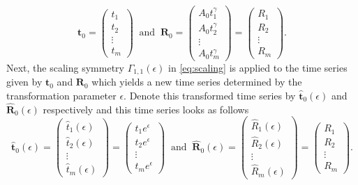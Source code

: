 $$\mathbf{t}_0=\begin{pmatrix}t_1\\t_2\\\vdots\\t_m\end{pmatrix}\;\;\mathrm{and}\;\;\mathbf{R}_0=\begin{pmatrix}A_0t_1^{\gamma} \\A_0t_2^{\gamma}\\\vdots\\A_0t_m^{\gamma}\end{pmatrix}=\begin{pmatrix}R_1 \\R_2\\\vdots\\R_m\end{pmatrix}.$$
Next, the scaling symmetry $\Gamma_{1,1}(\epsilon)$ in \eqref{eq:scaling} is applied to the time series given by $\mathbf{t}_0$ and $\mathbf{R}_0$ which yields a new time series determined by the transformation parameter $\epsilon$. Denote this transformed time series by $\mathbf{\hat{t}}_0(\epsilon)$ and $\mathbf{\hat{R}}_0(\epsilon)$ respectively and this time series looks as follows
$$\mathbf{\hat{t}}_0(\epsilon)=\begin{pmatrix}\hat{t}_1(\epsilon)\\\hat{t}_2(\epsilon)\\\vdots\\\hat{t}_m(\epsilon)\end{pmatrix}=\begin{pmatrix}t_1e^{\epsilon}\\t_2e^{\epsilon}\\\vdots\\t_me^{\epsilon}\end{pmatrix}\;\;\mathrm{and}\;\;\mathbf{\hat{R}}_0(\epsilon)=\begin{pmatrix}\hat{R}_1(\epsilon) \\\hat{R}_2(\epsilon)\\\vdots\\\hat{R}_m(\epsilon)\end{pmatrix}=\begin{pmatrix}R_1 \\R_2\\\vdots\\R_m\end{pmatrix}.$$
